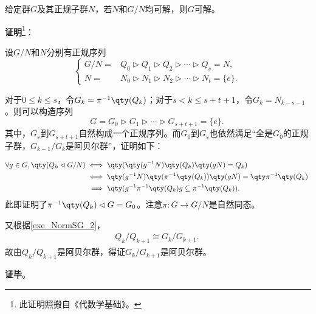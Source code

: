 \begin{lemma}{}
给定群$G$及其正规子群$N$，若$N$和$G/N$均可解，则$G$可解。
\end{lemma}


\textbf{证明}\footnote{此证明照搬自《代数学基础》。}：

设$G/N$和$N$分别有正规序列
\begin{equation}
    \left\{
    \begin{aligned}
        G/N ={}& Q_0\rhd Q_1\rhd Q_2\rhd\cdots\rhd Q_s=N, \\
        N ={}& N_0\rhd N_1\rhd N_2\rhd\cdots\rhd N_t=\{e\}. 
    \end{aligned}
    \right. ~
\end{equation}

对于$0\leq k\leq s$，令$G_k=\pi^{-1}\qty(Q_k)$；对于$s<k\leq s+t+1$，令$G_k=N_{k-s-1}$。则可以构造序列
\begin{equation}
    G=G_0\rhd G_1\rhd\cdots\rhd G_{s+t+1}=\{e\}. ~
\end{equation}
其中，$G_s$到$G_{s+t+1}$自然构成一个正规序列。而$G_0$到$G_s$也依然满足“全是$G_0$的正规子群，$G_{k-1}/G_{k}$是阿贝尔群”，证明如下：

\begin{equation}
\begin{aligned}
    \forall g\in G, \qty(Q_k\lhd G/N) \iff{}& \qty(\qty(g^{-1}N)\qty(Q_k)\qty(gN)=Q_k)\\
    \iff{}& \qty(g^{-1}N)\qty(\pi^{-1}\qty(Q_k))\qty(gN)=\qty\pi^{-1}\qty(Q_k)\\
    \implies{}& \qty(g^{-1}\pi^{-1}\qty(Q_k)g\subseteq \pi^{-1}\qty(Q_k)). 
\end{aligned}~
\end{equation}
此即证明了$\pi^{-1}\qty(Q_k)\lhd G=G_0$。注意$\pi: G\to G/N$是自然同态。

又根据\autoref{exe_NormSG_2}，
\begin{equation}
    \begin{aligned}
        Q_k/Q_{k+1} \cong G_k/G_{k+1}. 
    \end{aligned}~
\end{equation}
故由$Q_k/Q_{k+1}$是阿贝尔群，得证$G_k/G_{k+1}$是阿贝尔群。


\textbf{证毕}。

















